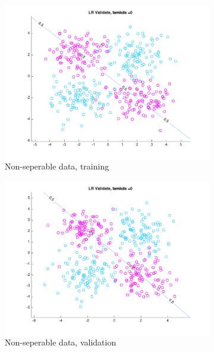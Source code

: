 \begin{figure}[h!]
    \begin{subfigure}[b]{0.4\textwidth}
	\includegraphics[scale=0.4]{hw2_1_nonsep_a_0.pdf}
	\caption{Non-seperable data, training}\label{fig:data_nonsep_a}
    \end{subfigure}  
    \quad
    \begin{subfigure}[b]{0.4\textwidth}
	\includegraphics[scale=0.4]{hw2_1_nonsep_b_0.pdf}
	\caption{Non-seperable data, validation}\label{fig:data_nonsep_b}
    \end{subfigure}  
    \caption{}    
\end{figure}

